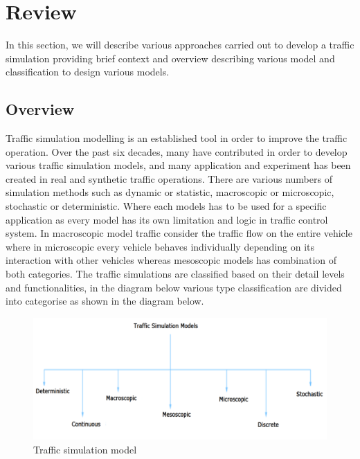 \section{Review}

In this section, we will describe various approaches carried out to develop a traffic simulation providing brief context and overview describing various model and classification to design various models. 

 \subsection{Overview}
Traffic simulation modelling is an established tool in order to improve the traffic operation. Over the past six decades, many have contributed in order to develop various traffic simulation models, and many application and experiment has been created in real and synthetic traffic operations. There are various numbers of simulation methods such as dynamic or statistic, macroscopic or microscopic, stochastic or deterministic. Where each models has to be used for a specific application as every model has its own limitation and logic in traffic control system.  In macroscopic model traffic consider the traffic flow on the entire vehicle where in microscopic every vehicle behaves individually depending on its interaction with other vehicles whereas mesoscopic models has combination of both categories. The traffic simulations are classified based on their detail levels and functionalities, in the diagram below various type classification are divided into categorise   as shown in the diagram below.

\begin{figure}[h]
\includegraphics[width=14cm]{pics/simulationModel}
\caption{Traffic simulation model}
\centering

\end{figure}

